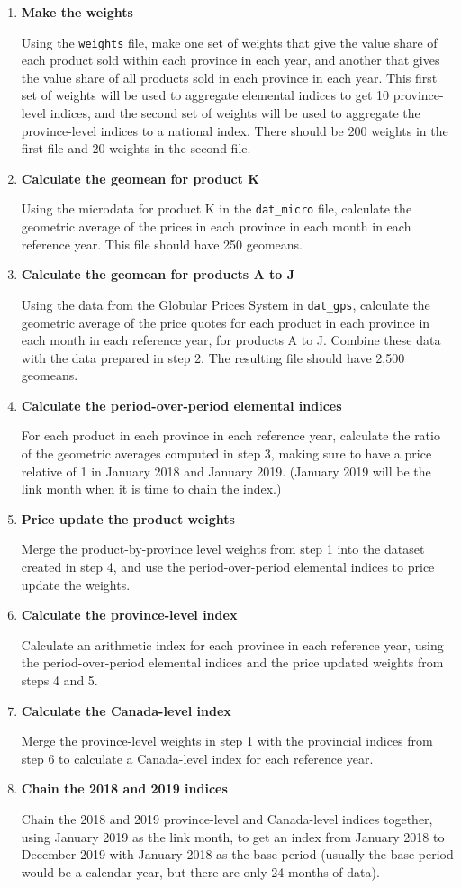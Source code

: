 \documentclass[]{article}
\begin{document}
\begin{enumerate}
\def\labelenumi{\arabic{enumi}.}
\item
  \textbf{Make the weights}

  Using the \texttt{weights} file, make one set of weights that give the value share of each product sold within each province in each year, and another that gives the value share of all products sold in each province in each year. This first set of weights will be used to aggregate elemental indices to get 10 province-level indices, and the second set of weights will be used to aggregate the province-level indices to a national index. There should be 200 weights in the first file and 20 weights in the second file.
\item
  \textbf{Calculate the geomean for product K}

  Using the microdata for product K in the \texttt{dat\_micro} file, calculate the geometric average of the prices in each province in each month in each reference year. This file should have 250 geomeans.
\item
  \textbf{Calculate the geomean for products A to J}

  Using the data from the Globular Prices System in \texttt{dat\_gps}, calculate the geometric average of the price quotes for each product in each province in each month in each reference year, for products A to J. Combine these data with the data prepared in step 2. The resulting file should have 2,500 geomeans.
\item
  \textbf{Calculate the period-over-period elemental indices}

  For each product in each province in each reference year, calculate the ratio of the geometric averages computed in step 3, making sure to have a price relative of 1 in January 2018 and January 2019. (January 2019 will be the link month when it is time to chain the index.)
\item
  \textbf{Price update the product weights}

  Merge the product-by-province level weights from step 1 into the dataset created in step 4, and use the period-over-period elemental indices to price update the weights.
\item
  \textbf{Calculate the province-level index}

  Calculate an arithmetic index for each province in each reference year, using the period-over-period elemental indices and the price updated weights from steps 4 and 5.
\item
  \textbf{Calculate the Canada-level index}

  Merge the province-level weights in step 1 with the provincial indices from step 6 to calculate a Canada-level index for each reference year.
\item
  \textbf{Chain the 2018 and 2019 indices}

  Chain the 2018 and 2019 province-level and Canada-level indices together, using January 2019 as the link month, to get an index from January 2018 to December 2019 with January 2018 as the base period (usually the base period would be a calendar year, but there are only 24 months of data).
\end{enumerate}
\end{document}
